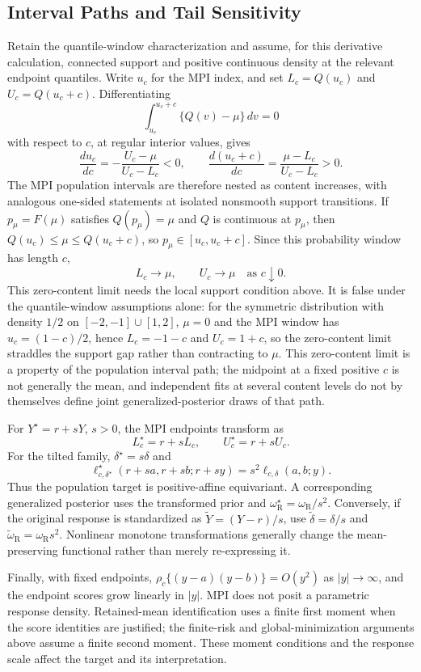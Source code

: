 \documentclass[11pt]{article}
\begin{document}
\subsection{Interval Paths and Tail Sensitivity}

Retain the quantile-window characterization and assume, for this derivative
calculation, connected support and positive continuous density at the relevant
endpoint quantiles. Write \(u_c\) for the MPI index, and set
\(L_c=Q(u_c)\) and \(U_c=Q(u_c+c)\). Differentiating
\[
\int_{u_c}^{u_c+c}\{Q(v)-\mu\}\,dv=0
\]
with respect to \(c\), at regular interior values, gives
\[
\frac{du_c}{dc}
=-\frac{U_c-\mu}{U_c-L_c}<0,
\qquad
\frac{d(u_c+c)}{dc}
=\frac{\mu-L_c}{U_c-L_c}>0.
\]
The MPI population intervals are therefore nested as content
increases, with analogous one-sided statements at isolated nonsmooth support
transitions. If \(p_\mu=F(\mu)\) satisfies \(Q(p_\mu)=\mu\) and \(Q\) is
continuous at \(p_\mu\), then \(Q(u_c)\le\mu\le Q(u_c+c)\), so
\(p_\mu\in[u_c,u_c+c]\). Since this probability window has length \(c\),
\[
L_c\longrightarrow\mu,\qquad U_c\longrightarrow\mu
\quad\text{as }c\downarrow0.
\]
This zero-content limit needs the local support condition above. It is false
under the quantile-window assumptions alone: for the symmetric distribution
with density \(1/2\) on \([-2,-1]\cup[1,2]\), \(\mu=0\) and the MPI
window has \(u_c=(1-c)/2\), hence \(L_c=-1-c\) and \(U_c=1+c\), so the
zero-content limit straddles the support gap rather than contracting to
\(\mu\). This zero-content limit is a property of the population
interval path; the
midpoint at a fixed positive \(c\) is not generally the mean, and independent
fits at several content levels do not by themselves define joint
generalized-posterior draws of that path.

For \(Y^\star=r+sY\), \(s>0\), the MPI endpoints transform as
\[
L_c^\star=r+sL_c,\qquad U_c^\star=r+sU_c.
\]
For the tilted family, \(\delta^\star=s\delta\) and
\[
\ell^\star_{c,\delta^\star}
(r+sa,r+sb;r+sy)
=s^2\ell_{c,\delta}(a,b;y).
\]
Thus the population target is positive-affine equivariant. A corresponding
generalized posterior uses the transformed prior and
\(\omega_{\mathrm R}^\star=\omega_{\mathrm R}/s^2\). Conversely, if the
original response is standardized as \(\widetilde Y=(Y-r)/s\), use
\(\widetilde\delta=\delta/s\) and
\(\widetilde\omega_{\mathrm R}=\omega_{\mathrm R}s^2\).
Nonlinear monotone transformations generally change the mean-preserving
functional rather than merely re-expressing it.

Finally, with fixed endpoints,
\(\rho_c\{(y-a)(y-b)\}=O(y^2)\) as \(|y|\to\infty\), and the endpoint scores
grow linearly in \(|y|\). MPI does not posit a parametric response density.
Retained-mean identification uses a finite first moment when the score
identities are justified; the finite-risk and global-minimization arguments
above assume a finite second moment. These moment conditions and the response
scale affect the target and its interpretation.
\end{document}
